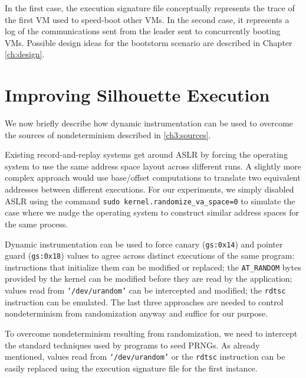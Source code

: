 In the first case, the execution signature file
conceptually represents the trace of the first VM used to speed-boot
other VMs. In the second case, it represents a log of the communications 
sent from the leader sent to concurrently booting VMs. Possible
design ideas for the bootstorm scenario are described 
in Chapter \ref{ch:design}.

\section{Improving Silhouette Execution} \label{silimprove}
We now briefly describe how dynamic instrumentation can be used to overcome
the sources of nondeterminism described in \ref{ch3:sources}. \newline

 \newline
Existing record-and-replay systems get around ASLR by
forcing the operating system to use the same address space layout across
different runs. A slightly more complex approach 
would use base/offset computations to translate two equivalent 
addresses between different executions. 
For our experiments, we simply disabled ASLR using the command
\texttt {sudo kernel.randomize\_va\_space=0} to simulate the 
case where we nudge the operating system to construct
similar address spaces for the same process. \newline

 \newline
Dynamic instrumentation can be used to force canary (\texttt{gs:0x14})
and pointer guard (\texttt{gs:0x18}) values
to agree across distinct executions of the same program:
instructions that initialize them can be
modified or replaced; the \texttt{AT\_RANDOM} bytes 
provided by the kernel can be
modified before they are read by the application; 
values read from \texttt{`/dev/urandom'} can be 
intercepted and modified; the \texttt{rdtsc} instruction can be emulated.
The last three approaches are needed to control nondeterminism
from randomization anyway and suffice for our purpose. \newline

 \newline
To overcome nondeterminism resulting from randomization,
we need to intercept the standard techniques
used by programs to seed PRNGs.
As already mentioned, values read from \texttt{`/dev/urandom'}
or the \texttt{rdtsc} instruction can be easily replaced
using the execution signature file for the first instance.

